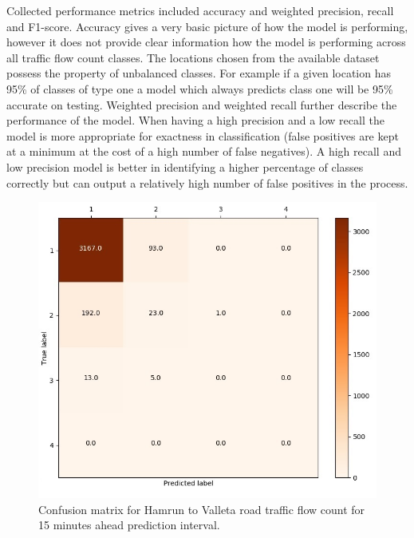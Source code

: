 \documentclass[12pt, a4paper]{report}
\theoremstyle{definition}
\theoremstyle{definition}%
\theoremstyle{definition}%
\theoremstyle{definition}%
\theoremstyle{definition}%
\theoremstyle{definition}%
\begin{document}
Collected performance metrics included accuracy and weighted precision, recall and F1-score. Accuracy gives a very basic picture of how the model is performing, however it does not provide clear information how the model is performing across all traffic flow count classes. The locations chosen from the available dataset possess the property of unbalanced classes. For example if a given location has 95\% of classes of type one a model which always predicts class one will be 95\% accurate on testing. Weighted precision and weighted recall further describe the performance of the model. When having a high precision and a low recall the model is more appropriate for exactness in classification (false positives are kept at a minimum at the cost of a high number of false negatives). A high recall and low precision model is better in identifying  a higher percentage of classes correctly but can output a relatively high number of false positives in the process.   

\begin{figure}[h]	
	\includegraphics[scale=0.7]{confusion_matrix_hamrun_valletta_342_4bin_15min.jpg}
	\centering
	\caption[Confusion matrix Hamrun to Valletta traffic flow prediction]{Confusion matrix for Hamrun to Valleta road traffic flow count for 15 minutes ahead prediction interval.}
	\label{fig:confusion_matrix_hamrun_valletta_15min}
\end{figure}
\end{document}
